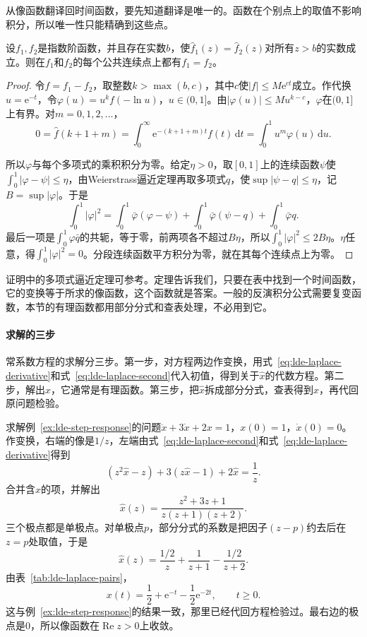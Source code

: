 从像函数翻译回时间函数，要先知道翻译是唯一的。函数在个别点上的取值不影响积分，所以唯一性只能精确到这些点。

\begin{theorem}[Laplace变换的唯一性]
\label{thm:lde-laplace-uniqueness}
设$f_1,f_2$是指数阶函数，并且存在实数$b$，使$\hat{f}_1(z)=\hat{f}_2(z)$对所有$z>b$的实数成立。则在$f_1$和$f_2$的每个公共连续点上都有$f_1=f_2$。
\end{theorem}

\begin{proof}
令$f=f_1-f_2$，取整数$k>\max(b,c)$，其中$c$使$\lvert f\rvert\leq M\mathrm{e}^{ct}$成立。作代换$u=\mathrm{e}^{-t}$，令$\varphi(u)=u^{k}f(-\ln u)$，$u\in(0,1]$。由$\lvert\varphi(u)\rvert\leq Mu^{k-c}$，$\varphi$在$(0,1]$上有界。对$m=0,1,2,\ldots$，
\[
 0=\hat{f}(k+1+m)=\int_0^{\infty}\mathrm{e}^{-(k+1+m)t}f(t)\,\mathrm{d}t=\int_0^1u^{m}\varphi(u)\,\mathrm{d}u.
\]

所以$\varphi$与每个多项式的乘积积分为零。给定$\eta>0$，取$[0,1]$上的连续函数$\psi$使$\int_0^1\lvert\varphi-\psi\rvert\leq\eta$，由Weierstrass逼近定理再取多项式$q$，使$\sup\lvert\psi-q\rvert\leq\eta$，记$B=\sup\lvert\varphi\rvert$。于是
\[
 \int_0^1\lvert\varphi\rvert^2=\int_0^1\bar{\varphi}(\varphi-\psi)+\int_0^1\bar{\varphi}(\psi-q)+\int_0^1\bar{\varphi}q.
\]
最后一项是$\int_0^1\varphi\bar{q}$的共轭，等于零，前两项各不超过$B\eta$，所以$\int_0^1\lvert\varphi\rvert^2\leq2B\eta$。$\eta$任意，得$\int_0^1\lvert\varphi\rvert^2=0$。分段连续函数平方积分为零，就在其每个连续点上为零。
\end{proof}

证明中的多项式逼近定理可参考。定理告诉我们，只要在表中找到一个时间函数，它的变换等于所求的像函数，这个函数就是答案。一般的反演积分公式需要复变函数，本节的有理函数都用部分分式和查表处理，不必用到它。

\paragraph{求解的三步}
常系数方程的求解分三步。第一步，对方程两边作变换，用式~\eqref{eq:lde-laplace-derivative}和式~\eqref{eq:lde-laplace-second}代入初值，得到关于$\hat{x}$的代数方程。第二步，解出$\hat{x}$，它通常是有理函数。第三步，把$\hat{x}$拆成部分分式，查表得到$x$，再代回原问题检验。

\begin{example}[带初值的阶跃响应]
\label{ex:lde-laplace-step}
求解例~\ref{ex:lde-step-response}的问题$\ddot{x}+3\dot{x}+2x=1$，$x(0)=1$，$\dot{x}(0)=0$。作变换，右端的像是$1/z$，左端由式~\eqref{eq:lde-laplace-second}和式~\eqref{eq:lde-laplace-derivative}得到
\[
 (z^2\hat{x}-z)+3(z\hat{x}-1)+2\hat{x}=\frac1z.
\]
合并含$\hat{x}$的项，并解出
\[
 \hat{x}(z)=\frac{z^2+3z+1}{z(z+1)(z+2)}.
\]
三个极点都是单极点。对单极点$p$，部分分式的系数是把因子$(z-p)$约去后在$z=p$处取值，于是
\[
 \hat{x}(z)=\frac{1/2}{z}+\frac{1}{z+1}-\frac{1/2}{z+2}.
\]
由表~\ref{tab:lde-laplace-pairs}，
\[
 x(t)=\frac12+\mathrm{e}^{-t}-\frac12\mathrm{e}^{-2t},\qquad t\geq0.
\]
这与例~\ref{ex:lde-step-response}的结果一致，那里已经代回方程检验过。最右边的极点是$0$，所以像函数在$\operatorname{Re}z>0$上收敛。
\end{example}

